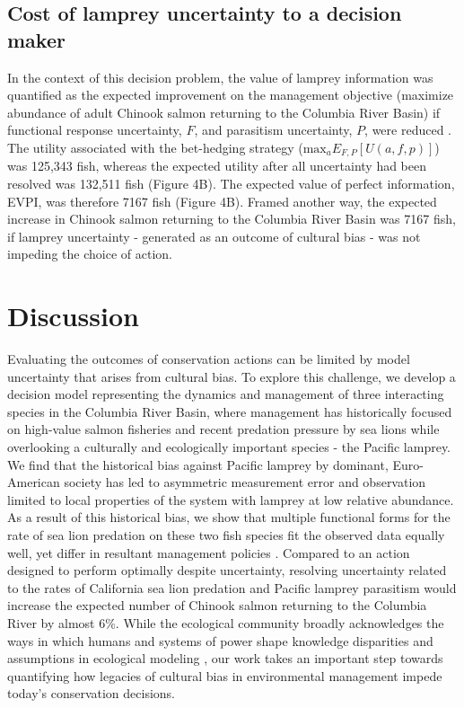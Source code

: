 \documentclass{article}
\begin{document}
\subsection*{Cost of lamprey uncertainty to a decision maker}

In the context of this decision problem, the value of lamprey information was quantified as the expected improvement on the management objective (maximize abundance of adult Chinook salmon returning to the Columbia River Basin) if functional response uncertainty, $F$, and parasitism uncertainty, $P$, were reduced \parencite{runge2011uncertainty}. The utility associated with the bet-hedging strategy  ($\text{max}_aE_{F,P}[U(a,f,p)]$) was 125,343 fish, whereas the expected utility after all uncertainty had been resolved was 132,511 fish (Figure 4B). The expected value of perfect information, EVPI, was therefore 7167 fish (Figure 4B). Framed another way, the expected increase in Chinook salmon returning to the Columbia River Basin was 7167 fish, if lamprey uncertainty - generated as an outcome of cultural bias - was not impeding the choice of action.


\section*{Discussion}

Evaluating the outcomes of conservation actions can be limited by model uncertainty that arises from cultural bias. To explore this challenge, we develop a decision model representing the dynamics and management of three interacting species in the Columbia River Basin, where management has historically focused on high-value salmon fisheries and recent predation pressure by sea lions while overlooking a culturally and ecologically important species - the Pacific lamprey. We find that the historical bias against Pacific lamprey by dominant, Euro-American society has led to asymmetric measurement error and observation limited to local properties of the system with lamprey at low relative abundance. As a result of this historical bias, we show that multiple functional forms for the rate of sea lion predation on these two fish species fit the observed data equally well, yet differ in resultant management policies \parencite{runge2002importance}. Compared to an action designed to perform optimally despite uncertainty, resolving uncertainty related to the rates of California sea lion predation and Pacific lamprey parasitism would increase the expected number of Chinook salmon returning to the Columbia River by almost 6\%. While the ecological community broadly acknowledges the ways in which humans and systems of power shape knowledge disparities and assumptions in ecological modeling \parencite{chapman2024biodiversity, silver2022fish}, our work takes an important step towards quantifying how legacies of cultural bias in environmental management impede today's conservation decisions.
\end{document}
